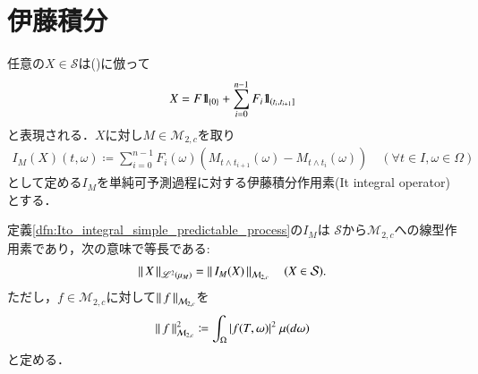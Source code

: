 \section{伊藤積分}
	
	\begin{screen}
		\begin{dfn}[単純可予測過程に対する伊藤積分]
			任意の$X \in \mathcal{S}$は()に倣って
			\begin{align}
				X = F \mbox{1}\hspace{-0.25em}\mbox{l}_{\{0\}} + \sum_{i=0}^{n-1} F_i \mbox{1}\hspace{-0.25em}\mbox{l}_{\left(t_i,t_{i+1}\right]}
				\label{eq:dfn_Ito_integral_simple_predictable_process}
			\end{align}
			と表現される．$X$に対し$M \in \mathcal{M}_{2,c}$を取り
			\begin{align}
				I_M(X)(t,\omega) \coloneqq \sum_{i=0}^{n-1} F_i(\omega) \left(M_{t \wedge t_{i+1}}(\omega) - M_{t \wedge t_i}(\omega)\right)
				\quad (\forall t \in I,\omega \in \Omega)
			\end{align}
			として定める$I_M$を単純可予測過程に対する伊藤積分作用素(It integral operator)とする．
			\label{dfn:Ito_integral_simple_predictable_process}
		\end{dfn}
	\end{screen}
	
	\begin{screen}
		\begin{thm}[伊藤積分の連続線型性]
			定義\ref{dfn:Ito_integral_simple_predictable_process}の$I_M$は
			$\mathcal{S}$から$\mathcal{M}_{2,c}$への線型作用素であり，次の意味で等長である:
			\begin{align}
				\left\|\, X\, \right\|_{\mathscr{L}^{2} \left(\mu_M\right)} = \left\|\, I_M(X)\, \right\|_{\mathcal{M}_{2,c}}
				\quad (X \in \mathcal{S}).
			\end{align}
			ただし，$f \in \mathcal{M}_{2,c}$に対して$\left\|\, f\, \right\|_{\mathcal{M}_{2,c}}$を
			\begin{align}
				\left\|\, f\, \right\|_{\mathcal{M}_{2,c}}^2 \coloneqq \int_\Omega |f(T,\omega)|^2\ \mu(d\omega)
			\end{align}
			と定める．
		\end{thm}
	\end{screen}
	
